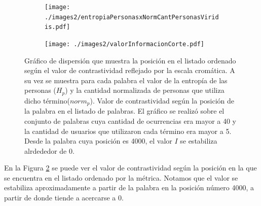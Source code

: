 \begin{figure}[!ht]\centering
  \begin{subfigure}[t]{0.49\linewidth}
    \centering
\texttt{[image: ./images2/entropiaPersonasxNormCantPersonasViridis.pdf]}
\caption{} 
\label{fig:infoValue} 
  
   \end{subfigure}
   \begin{subfigure}[t]{0.49\linewidth}
      \centering
\texttt{[image: ./images2/valorInformacionCorte.pdf]}
\caption{} 
\label{fig:ivalue}
  \end{subfigure}
   \caption{ Gráfico de dispersión que muestra la posición en el listado ordenado según el valor de contrastividad reflejado por la escala cromática. A su vez se muestra para cada palabra el valor de la entropía de las personas ($H_p$) y la cantidad normalizada de personas que utiliza dicho término($norm_p$).  Valor de contrastividad según la posición de la palabra en el listado de palabras. El gráfico se realizó sobre el conjunto de palabras cuya cantidad de ocurrencias era mayor a 40 y la cantidad de usuarios que utilizaron cada término era mayor a 5. Desde la palabra cuya posición es 4000, el valor $I$ se estabiliza alrdededor de 0.}
   \label{fig:infoeivalue}
\end{figure}


En la Figura \ref{fig:ivalue} se puede ver el valor de contrastividad según la posición en la que se encuentra en el listado ordenado por la métrica. Notamos que el valor se estabiliza aproximadamente a partir de la palabra en la posición número 4000, a partir de donde tiende a acercarse a 0.





